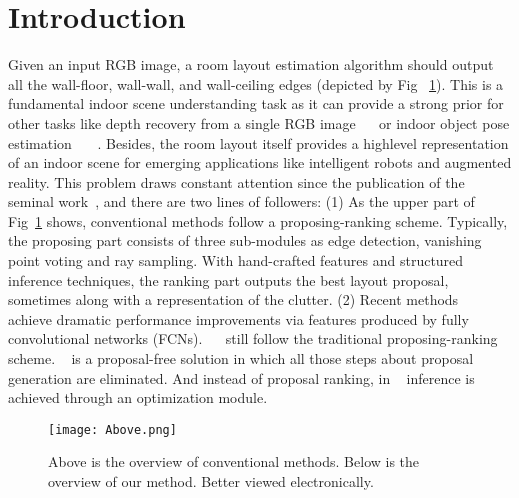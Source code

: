 \documentclass[10pt,twocolumn,letterpaper]{article}
\begin{document}
\section{Introduction}
Given an input RGB image, a room layout estimation
algorithm should output all the wall-floor, wall-wall, and
wall-ceiling edges (depicted by Fig ~\ref{fig:overview}). This is a fundamental
indoor scene understanding task as it can provide
a strong prior for other tasks like depth recovery from a
single RGB image ~\cite{Eigen2014Depth}~\cite{Eigen_2014_CVPR} or indoor object pose estimation
~\cite{Song2014Sliding}~\cite{Gupta2015Aligning}~\cite{Song_2016_CVPR}. Besides, the room layout itself provides a highlevel
representation of an indoor scene for emerging applications
like intelligent robots and augmented reality. This
problem draws constant attention since the publication of
the seminal work~\cite{Hedau2010Recovering}, and there are two lines of followers:
(1) As the upper part of Fig~\ref{fig:overview}  shows, conventional methods
follow a proposing-ranking scheme. Typically, the proposing part consists of three sub-modules as edge detection,
vanishing point voting and ray sampling. With
hand-crafted features and structured inference techniques,
the ranking part outputs the best layout proposal, sometimes
along with a representation of the clutter.
(2) Recent methods~\cite{Mallya2015Learning}~\cite{Dasgupta2016DeLay}~\cite{Ren2016A} achieve dramatic performance
improvements via features produced by fully convolutional
networks (FCNs). ~\cite{Mallya2015Learning}~\cite{Ren2016A} still follow the traditional
proposing-ranking scheme. ~\cite{Dasgupta2016DeLay} is a proposal-free
solution in which all those steps about proposal generation
are eliminated. And instead of proposal ranking, in ~\cite{Dasgupta2016DeLay} inference
is achieved through an optimization module.\par

\begin{figure}[H]
\begin{center}
\texttt{[image: Above.png]}
\end{center}
   \caption{Above is the overview of conventional methods. Below is the overview of our method. Better viewed electronically.}
\label{fig:overview}
\end{figure}


\end{document}
